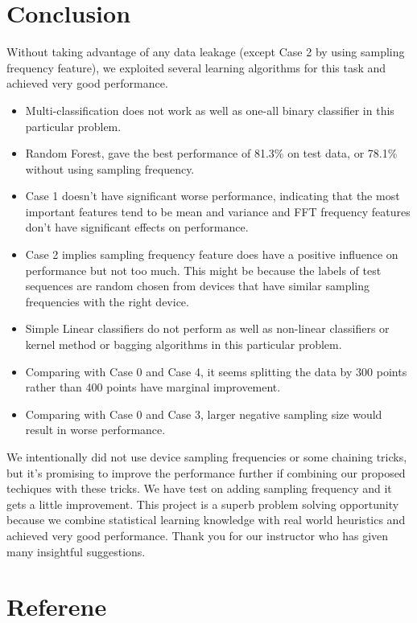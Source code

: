 \documentclass[11pt,letterpaper]{article}
\begin{document}
\section{Conclusion}
Without taking advantage of any data leakage (except Case 2 by using sampling frequency feature), we exploited several learning algorithms for this task and achieved very good performance.
\begin{itemize}
\item Multi-classification does not work as well as one-all binary classifier in this particular problem. 
\item Random Forest, gave the best performance of 81.3\% on test data, or 78.1\% without using sampling frequency. 
\item Case 1 doesn't have significant worse performance, indicating that the most important features tend to be mean and variance and FFT frequency features don't have significant effects on performance.
\item Case 2 implies sampling frequency feature does have a positive influence on performance but not too much. This might be because the labels of test sequences are random chosen from devices that have similar sampling frequencies with the right device.  
\item Simple Linear classifiers do not perform as well as non-linear classifiers or kernel method or bagging algorithms in this particular problem.
\item Comparing with Case 0 and Case 4, it seems splitting the data by 300 points rather than 400 points have marginal improvement.
\item Comparing with Case 0 and Case 3, larger negative sampling size would result in worse performance. 

\end{itemize}
We intentionally did not use device sampling frequencies or some chaining tricks, but it's promising to improve the performance further if combining our proposed techiques with these tricks. We have test on adding sampling frequency and it gets a little improvement. This project is a superb problem solving opportunity because we combine statistical learning knowledge with real world heuristics and achieved very good performance. Thank you for our instructor who has given many insightful suggestions.


\section{Referene} %
\label{sec:referene}
\end{document}
